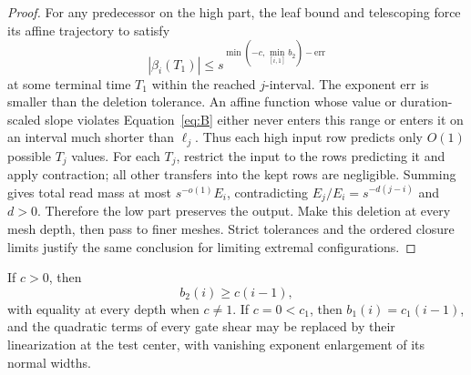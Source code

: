 \begin{proof}
For any predecessor on the high part, the leaf bound and telescoping
force its affine trajectory to satisfy
\[
 |\beta_i(T_1)|\le
       s^{\min(-c,\min_{[i,1]}b_2)-\mathrm{err}}
\]
at some terminal time $T_1$ within the reached $j$-interval.
The exponent $\mathrm{err}$ is smaller than the deletion tolerance.
An affine function whose value or duration-scaled slope violates
Equation~\eqref{eq:B} either never enters this range or enters it on
an interval much shorter than $\ell_j$.  Thus each high input row
predicts only $O(1)$ possible $T_j$ values.  For each $T_j$, restrict
the input to the rows predicting it and apply contraction; all other
transfers into the kept rows are negligible.  Summing gives total read
mass at most $s^{-o(1)}E_i$, contradicting $E_j/E_i=s^{-d(j-i)}$ and
$d>0$.  Therefore the low part preserves the output.  Make this deletion
at every mesh depth, then pass to finer meshes.  Strict tolerances and
the ordered closure limits justify the same conclusion for limiting
extremal configurations.
\end{proof}

\begin{proposition}\label{cyl:shape-constraints}
If $c>0$, then
\[
 b_2(i)\ge c(i-1),
\]
with equality at every depth when $c\ne1$.
If $c=0<c_1$, then $b_1(i)=c_1(i-1)$, and the quadratic terms of every
gate shear may be replaced by their linearization at the test center,
with vanishing exponent enlargement of its normal widths.
\end{proposition}

